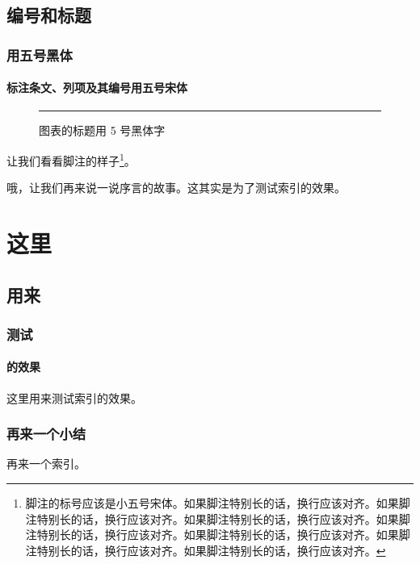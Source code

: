 \documentclass{GB-template}
\begin{document}
\section{编号和标题}
\subsection{用五号黑体}
\subsubsection{标注条文、列项及其编号用五号宋体}
\begin{figure}[htb]
\centering
\rule{4cm}{3cm}
\caption{图表的标题用 5 号黑体字}\label{fig:dummyfigure}
\end{figure}

让我们看看脚注的样子\footnote{脚注的标号应该是小五号宋体。如果脚注特别长的话，换行应该对齐。如果脚注特别长的话，换行应该对齐。如果脚注特别长的话，换行应该对齐。如果脚注特别长的话，换行应该对齐。如果脚注特别长的话，换行应该对齐。如果脚注特别长的话，换行应该对齐。如果脚注特别长的话，换行应该对齐。}。

哦，让我们再来说一说序言的故事。这其实是为了测试索引的效果。

\chapter{这里}
\section{用来}
\subsection{测试}
\subsubsection{的效果}
这里用来测试索引的效果。
\subsection{再来一个小结}
再来一个索引。
\appendix
\autoclearpage
{}
\end{document}
